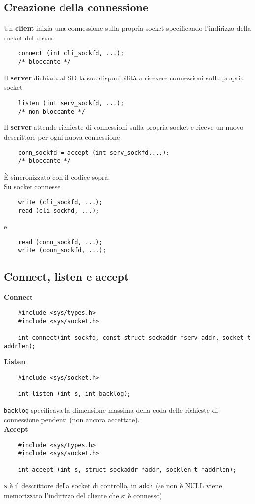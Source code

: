 \documentclass[italian,12pt,a4paper]{article}
\begin{document}
\subsection{Creazione della connessione}
Un \textbf{client} inizia una connessione sulla propria socket specificando l'indirizzo della socket del server
\begin{verbatim}
	connect (int cli_sockfd, ...);
	/* bloccante */
\end{verbatim}
Il \textbf{server} dichiara al SO la sua disponibilità a ricevere connessioni sulla propria socket
\begin{verbatim}
	listen (int serv_sockfd, ...);
	/* non bloccante */
\end{verbatim}
Il \textbf{server} attende richieste di connessioni sulla propria socket e riceve un nuovo descrittore per ogni nuova connessione
\begin{verbatim}
	conn_sockfd = accept (int serv_sockfd,...);
	/* bloccante */
\end{verbatim}
È sincronizzato con il codice sopra.\\
Su socket connesse
\begin{verbatim}
	write (cli_sockfd, ...);
	read (cli_sockfd, ...);
\end{verbatim}
e 
\begin{verbatim}
	read (conn_sockfd, ...);
	write (conn_sockfd, ...);
\end{verbatim}
\subsection{Connect, listen e accept}
\textbf{Connect}
\begin{verbatim}
	#include <sys/types.h>
	#include <sys/socket.h>
	
	int connect(int sockfd, const struct sockaddr *serv_addr, socket_t addrlen);
\end{verbatim}
\textbf{Listen}
\begin{verbatim}
	#include <sys/socket.h>
	
	int listen (int s, int backlog);
\end{verbatim}
\verb|backlog| specificava la dimensione massima della coda delle richieste di connessione pendenti (non ancora accettate).\\
\textbf{Accept}
\begin{verbatim}
	#include <sys/types.h>
	#include <sys/socket.h>
	
	int accept (int s, struct sockaddr *addr, socklen_t *addrlen);
\end{verbatim}
\verb|s| è il descrittore della socket di controllo, in \verb|addr| (se non è NULL viene memorizzato l'indirizzo del cliente che si è connesso)
\end{document}
